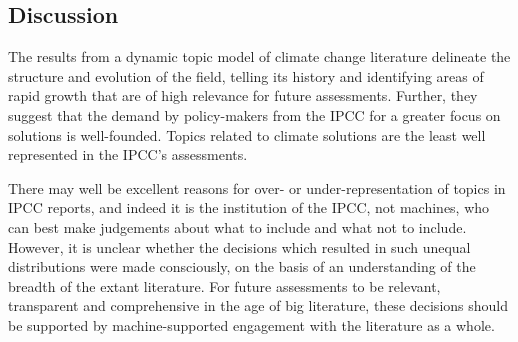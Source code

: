\documentclass{article}
\begin{document}
\begin{linenumbers}
%




\section*{Discussion}

%

The results from a dynamic topic model of climate change literature delineate the structure and evolution of the field, telling its history and identifying areas of rapid growth that are of high relevance for future assessments. Further, they suggest that the demand by policy-makers from the IPCC for a greater focus on solutions is well-founded. Topics related to climate solutions are the least well represented in the IPCC's assessments.

There may well be excellent reasons for over- or under-representation of topics in IPCC reports, and indeed it is the institution of the IPCC, not machines, who can best make judgements about what to include and what not to include. However, it is unclear whether the decisions which resulted in such unequal distributions were made consciously, on the basis of an understanding of the breadth of the extant literature. For future assessments to be relevant, transparent and comprehensive in the age of big literature, these decisions should be supported by machine-supported engagement with the literature as a whole.



%
%
%

\pagebreak





\end{linenumbers}





%
%
\end{document}
